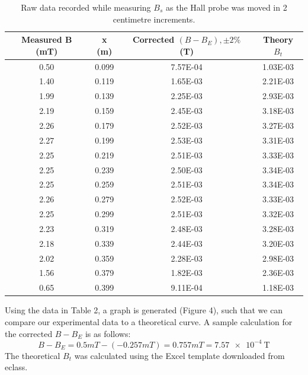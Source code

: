 \documentclass[letterpaper]{article}
\begin{document}
\begin{table}[]
 \centering
 \begin{tabular}{|c|c|c|c|}
  \hline
  Measured B (mT) & x (m) & Corrected  $(B - B_E),\pm 2\%$ (T) & Theory $B_t$ \\ \hline
  0.50            & 0.099 & 7.57E-04                           & 1.03E-03     \\ \hline
  1.40            & 0.119 & 1.65E-03                           & 2.21E-03     \\ \hline
  1.99            & 0.139 & 2.25E-03                           & 2.93E-03     \\ \hline
  2.19            & 0.159 & 2.45E-03                           & 3.18E-03     \\ \hline
  2.26            & 0.179 & 2.52E-03                           & 3.27E-03     \\ \hline
  2.27            & 0.199 & 2.53E-03                           & 3.31E-03     \\ \hline
  2.25            & 0.219 & 2.51E-03                           & 3.33E-03     \\ \hline
  2.25            & 0.239 & 2.50E-03                           & 3.34E-03     \\ \hline
  2.25            & 0.259 & 2.51E-03                           & 3.34E-03     \\ \hline
  2.26            & 0.279 & 2.52E-03                           & 3.33E-03     \\ \hline
  2.25            & 0.299 & 2.51E-03                           & 3.32E-03     \\ \hline
  2.23            & 0.319 & 2.48E-03                           & 3.28E-03     \\ \hline
  2.18            & 0.339 & 2.44E-03                           & 3.20E-03     \\ \hline
  2.02            & 0.359 & 2.28E-03                           & 2.98E-03     \\ \hline
  1.56            & 0.379 & 1.82E-03                           & 2.36E-03     \\ \hline
  0.65            & 0.399 & 9.11E-04                           & 1.18E-03     \\ \hline
 \end{tabular}
 \caption{Raw data recorded while measuring $B_s$ as the Hall probe was moved in 2 centimetre increments.}
\end{table}

Using the data in Table 2, a graph is generated (Figure 4), such that we can compare our
experimental data to a theoretical curve. A sample calculation for the corrected $B-B_E$
is as follows:
$$ B-B_E = 0.5 mT - (-0.257 mT) = 0.757 mT = \SI{7.57e-4}{\tesla}$$
The theoretical $B_t$ was calculated using the Excel template downloaded from eclass.
\end{document}
